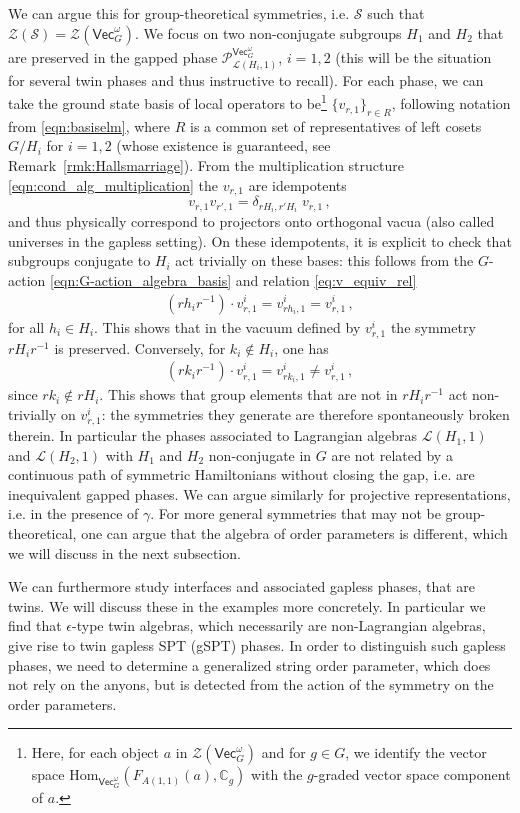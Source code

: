 \documentclass[aps,twocolumn,prx,floatfix,preprintnumbers, nofootinbib,10pt]{revtex4-2}
\numberwithin{equation}{section}
\theoremstyle{definition}
\newcommand{\be}{\begin{equation}}
\newcommand{\ee}{\end{equation}}
\newcommand{\ba}{\begin{aligned}}
\newcommand{\ea}{\end{aligned}}
\newcommand{\bC}{{\mathbb C}}
\newcommand{\cL}{\mathcal{L}}
\newcommand{\cP}{\mathcal{P}}
\newcommand{\cS}{\mathcal{S}}
\newcommand{\cZ}{\mathcal{Z}}
\newcommand{\Hom}{\text{Hom}}
\renewcommand{\Vec}{\mathsf{Vec}}
\begin{document}
We can argue this for group-theoretical symmetries, i.e. $\cS$ such that $\cZ (\cS) =\cZ(\Vec_G^\omega)$. We focus on two non-conjugate subgroups $H_1$ and $H_2$ that are preserved in the gapped phase $\cP^{\Vec_G^{\omega}}_{\cL(H_i,1)}$, $i=1,2$ (this will be the situation for several twin phases and thus instructive to recall). 
For each phase, we can take the ground state basis of local operators to be\footnote{Here, for each object $a$ in $\cZ(\Vec_G^\omega)$ and for $g\in G$, we identify the vector space $\Hom_{\Vec_G^\omega}(F_{A(1,1)}(a),\bC_g)$ with the $g$-graded vector space component of $a$.} $\{v_{r,1}\}_{r\in R}$, following notation from \eqref{eqn:basiselm}, where $R$ is a common set of representatives of left cosets $G/H_i$ for $i=1,2$ (whose existence is guaranteed, see Remark~\ref{rmk:Hallsmarriage}).
From the multiplication structure \eqref{eqn:cond_alg_multiplication} the $v_{r,1}$ are idempotents 
\be
    v_{r,1}v_{r',1}=\delta_{rH_i,r'H_i}\;v_{r,1}\,,
\ee
and thus physically correspond to projectors onto orthogonal vacua (also called universes in the gapless setting).
On these idempotents, it is explicit to check that subgroups conjugate to $H_i$ act trivially on these bases: this follows from the $G$-action \eqref{eqn:G-action_algebra_basis} and relation \eqref{eq:v_equiv_rel} 
\be\ba
    (rh_ir^{-1})\cdot v^i_{r,1}=v^i_{rh_i,1}=v^i_{r,1}\,,
\ea\ee
for all $h_i\in H_i$. This shows that in the vacuum defined by $v^i_{r,1}$ the symmetry $rH_ir^{-1}$ is preserved. Conversely, for $k_i\notin H_i$, one has
\be\ba
    (rk_ir^{-1})\cdot v^i_{r,1}=v^i_{rk_i,1}\neq v^i_{r,1}\,,
\ea\ee
since $rk_i\notin rH_i$. This shows that group elements that are not in $rH_ir^{-1}$ act non-trivially on $v_{r,1}^i$: the symmetries they generate are therefore spontaneously broken therein. In particular the phases associated to Lagrangian algebras $\cL (H_1, 1)$ and $\cL (H_2, 1)$ with $H_1$ and $H_2$ non-conjugate in $G$ are not related by a continuous path of symmetric Hamiltonians without closing the gap, i.e. are inequivalent gapped phases. We can argue similarly for projective representations, i.e. in the presence of $\gamma$. For more general symmetries that may not be group-theoretical, one can argue that the algebra of order parameters is different, which we will discuss in the next subsection. 

\vspace{2mm}
We can furthermore study interfaces and associated gapless phases, that are twins. We will discuss these in the examples more concretely. 
In particular we find that $\epsilon$-type twin algebras, which necessarily are non-Lagrangian algebras, give rise to twin gapless SPT (gSPT) phases. In order to distinguish such gapless phases, we need to determine a generalized string order parameter, which does not rely on the anyons, but is detected from the action of the symmetry on the order parameters. 
\end{document}
